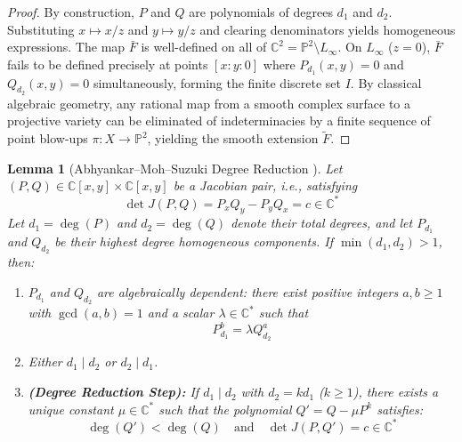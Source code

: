 \documentclass[11pt,reqno]{amsart}
\newtheorem{lemma}[theorem]{Lemma}
\theoremstyle{definition}
\begin{document}
\begin{proof}
By construction, $P$ and $Q$ are polynomials of degrees $d_1$ and $d_2$. Substituting $x \mapsto x/z$ and $y \mapsto y/z$ and clearing denominators yields homogeneous expressions. The map $\bar{F}$ is well-defined on all of $\mathbb{C}^2 = \mathbb{P}^2 \setminus L_\infty$. On $L_\infty$ ($z = 0$), $\bar{F}$ fails to be defined precisely at points $[x:y:0]$ where $P_{d_1}(x,y) = 0$ and $Q_{d_2}(x,y) = 0$ simultaneously, forming the finite discrete set $I$. By classical algebraic geometry, any rational map from a smooth complex surface to a projective variety can be eliminated of indeterminacies by a finite sequence of point blow-ups $\pi: X \to \mathbb{P}^2$, yielding the smooth extension $\tilde{F}$.
\end{proof}

\begin{lemma}[Abhyankar--Moh--Suzuki Degree Reduction \cite{AM1975, Suzuki1974}]
Let $(P, Q) \in \mathbb{C}[x,y] \times \mathbb{C}[x,y]$ be a Jacobian pair, i.e., satisfying
$$\det J(P, Q) = P_x Q_y - P_y Q_x = c \in \mathbb{C}^*$$
Let $d_1 = \deg(P)$ and $d_2 = \deg(Q)$ denote their total degrees, and let $P_{d_1}$ and $Q_{d_2}$ be their highest degree homogeneous components. If $\min(d_1, d_2) > 1$, then:
\begin{enumerate}
    \item $P_{d_1}$ and $Q_{d_2}$ are algebraically dependent: there exist positive integers $a, b \ge 1$ with $\gcd(a,b) = 1$ and a scalar $\lambda \in \mathbb{C}^*$ such that
    $$P_{d_1}^b = \lambda Q_{d_2}^a$$
    \item Either $d_1 \mid d_2$ or $d_2 \mid d_1$.
    \item \textbf{(Degree Reduction Step):} If $d_1 \mid d_2$ with $d_2 = k d_1$ ($k \ge 1$), there exists a unique constant $\mu \in \mathbb{C}^*$ such that the polynomial $Q' = Q - \mu P^k$ satisfies:
    $$\deg(Q') < \deg(Q) \quad \text{and} \quad \det J(P, Q') = c \in \mathbb{C}^*$$
\end{enumerate}
\end{lemma}
\end{document}

